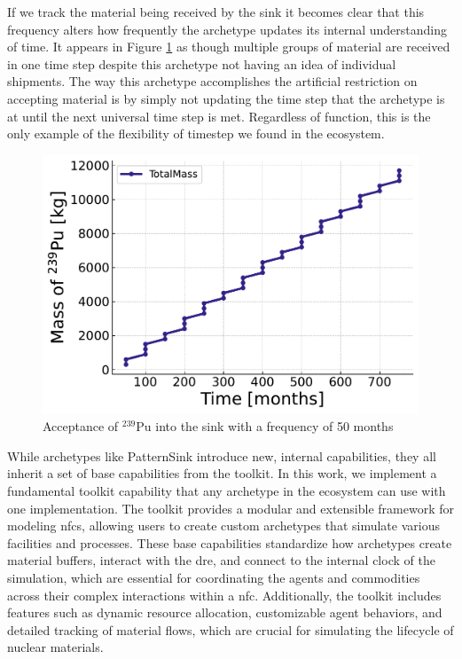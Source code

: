 If we track the material being received by the sink it becomes clear that this
frequency alters how frequently the archetype updates its internal
understanding of time. It appears in Figure \ref{fig:pattern_freq_50} as though
multiple groups of material are received in one time step despite this
archetype not having an idea of individual shipments. The way this archetype
accomplishes the artificial restriction on accepting material is by simply not
updating the time step that the archetype is at until the next universal time
step is met. Regardless of function, this is the only example of the
flexibility of timestep we found in the ecosystem.

\begin{figure}[H]
    \centering
    \includegraphics[scale=0.7]{images/cyclus/pattern_sink_fuel_transactions.pdf}
    \caption{Acceptance of $^{239}$Pu into the sink with a frequency of 50 months}
    \label{fig:pattern_freq_50}
\end{figure}

While archetypes like PatternSink introduce new, internal capabilities, they
all inherit a set of base capabilities from the \cyclus toolkit. In this work,
we implement a fundamental toolkit capability that any archetype in the \cyclus
ecosystem can use with one implementation. The \cyclus toolkit provides a
modular and extensible framework for modeling \glspl{nfc}, allowing users to
create custom archetypes that simulate various facilities and processes. These
base capabilities standardize how archetypes create material buffers, interact
with the \gls{dre}, and connect to the internal clock of the simulation, which
are essential for coordinating the agents and commodities across their complex
interactions within a \gls{nfc}. Additionally, the toolkit includes features
such as dynamic resource allocation, customizable agent behaviors, and detailed
tracking of material flows, which are crucial for simulating the lifecycle of
nuclear materials.

